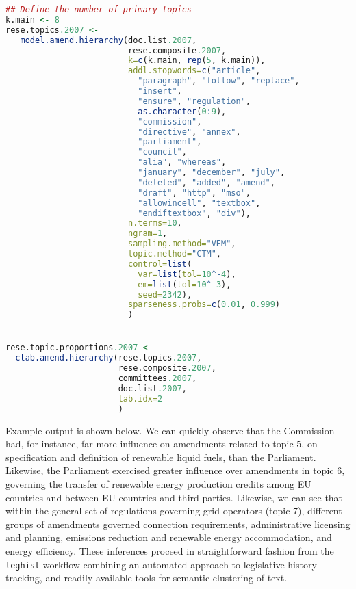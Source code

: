 \documentclass[11pt]{article}
\begin{document}
\begin{lstlisting}[language=R, numbers=none]
## Define the number of primary topics
k.main <- 8
rese.topics.2007 <- 
   model.amend.hierarchy(doc.list.2007,
                         rese.composite.2007,
                         k=c(k.main, rep(5, k.main)),
                         addl.stopwords=c("article",
                           "paragraph", "follow", "replace",
                           "insert",
                           "ensure", "regulation",
                           as.character(0:9),
                           "commission",
                           "directive", "annex",
                           "parliament",
                           "council",
                           "alia", "whereas",
                           "january", "december", "july",
                           "deleted", "added", "amend",
                           "draft", "http", "mso",
                           "allowincell", "textbox",
                           "endiftextbox", "div"),
                         n.terms=10,
                         ngram=1,
                         sampling.method="VEM",
                         topic.method="CTM",
                         control=list(
                           var=list(tol=10^-4),
                           em=list(tol=10^-3),
                           seed=2342),
                         sparseness.probs=c(0.01, 0.999)
                         )


rese.topic.proportions.2007 <-
  ctab.amend.hierarchy(rese.topics.2007,
                       rese.composite.2007,
                       committees.2007,
                       doc.list.2007,
                       tab.idx=2
                       )

\end{lstlisting}

Example output is shown below. We can quickly observe that the
Commission had, for instance, far more influence on amendments related
to topic 5, on specification and definition of renewable liquid fuels,
than the Parliament. Likewise, the Parliament exercised greater
influence over amendments in topic 6, governing the transfer of
renewable energy production credits among EU countries and between EU
countries and third parties. Likewise, we can see that within the
general set of regulations governing grid operators (topic 7),
different groups of amendments governed connection requirements,
administrative licensing and planning, emissions reduction and
renewable energy accommodation, and energy efficiency. These
inferences proceed in straightforward fashion from the
\texttt{leghist} workflow combining
an automated approach to legislative history tracking, and readily
available tools for semantic clustering of text. 
\end{document}
